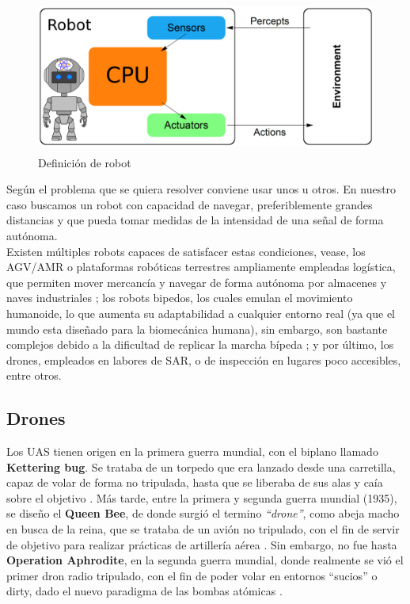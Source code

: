 \begin{figure} [H]
	\begin{center}
	\includegraphics[height=5cm]{imagenes/cap1/3_robot.png}
	\end{center}
	\caption[Definición de robot]{Definición de robot}
	\label{fig:robot_def}
\end{figure}

Según el problema que se quiera resolver conviene usar unos u otros. En nuestro caso buscamos un robot con capacidad de navegar, preferiblemente grandes distancias y que pueda tomar medidas de la intensidad de una señal de forma autónoma.\\

Existen múltiples robots capaces de satisfacer estas condiciones, vease, los \ac{AGV}/\ac{AMR} o plataformas robóticas terrestres ampliamente empleadas logística, que permiten mover mercancía y navegar de forma autónoma por almacenes y naves industriales \cite{agv-vs-amr}; los robots bipedos, los cuales emulan el movimiento humanoide, lo que aumenta su adaptabilidad a cualquier entorno real (ya que el mundo esta diseñado para la biomecánica humana), sin embargo, son bastante complejos debido a la dificultad de replicar la marcha bípeda \cite{10.3389/fmech.2020.00011}; y por último, los drones, empleados en labores de \ac{SAR}, o de inspección en lugares poco accesibles, entre otros.

\subsection{Drones}
\label{subsec:drones}

Los \ac{UAS} tienen origen en la primera guerra mundial, con el biplano llamado \textbf{Kettering bug}. Se trataba de un torpedo que era lanzado desde una carretilla, capaz de volar de forma no tripulada, hasta que se liberaba de sus alas y caía sobre el objetivo \cite{kettering-bug}. Más tarde, entre la primera y segunda guerra mundial (1935), se diseño el \textbf{Queen Bee}, de donde surgió el termino \emph{``drone''}, como abeja macho en busca de la reina, que se trataba de un avión no tripulado, con el fin de servir de objetivo para realizar prácticas de artillería aérea \cite{queen-bee}. Sin embargo, no fue hasta \textbf{Operation Aphrodite}, en la segunda guerra mundial, donde realmente se vió el primer dron radio tripulado, con el fin de poder volar en entornos ``sucios'' o dirty, dado el nuevo paradigma de las bombas atómicas \cite{operation-aphrodite}.\\

